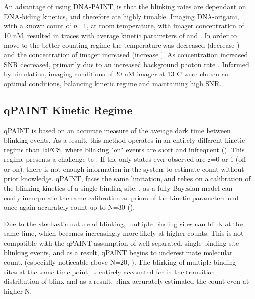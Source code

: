 An advantage of using DNA-PAINT, is that the blinking rates are dependant on DNA-biding kinetics,
	and therefore are highly tunable. %
	Imaging DNA-origami, with a known count of $n$=1, at room temperature, with imager concentration of 10 nM, 
	resulted in traces with average kinetic parameters of  and  . 
	In order to move to the better counting regime the temperature was decreased (decrease \poff) 
	and the concentration of imager increased (increase \pon).
	As concentration increased SNR decreased, primarily due to an increased background photon rate \rb.
	Informed by simulation, imaging conditions of 20 nM imager at 13 C were chosen as optimal conditions,
	balancing kinetic regime and maintaining high SNR.



\subsection{qPAINT Kinetic Regime}
qPAINT is based on an accurate measure of the average dark time between blinking events. 
	As a result, this method operates in an entirely different kinetic regime than lbFCS, where blinking 
	"on" events are short and infrequent ().
	This regime presents a challenge to \ours. If the only states ever observed are z=0 or 1 (off or on),
	there is not enough information in the system to estimate count without prior knowledge.
	qPAINT, faces the same limitation, and relies on a calibration of the blinking kinetics of a single binding site.
	\ours, as a fully Bayesian model can easily incorporate the same calibration as priors of the kinetic parameters
	and once again accurately count up to N=30 ().

Due to the stochastic nature of blinking, multiple binding sites can blink at the same time, 
	which becomes increasingly more likely at higher counts.
	This is not compatible with the qPAINT assumption of well separated, single binding-site blinking events, 
	and as a result, qPAINT begins to underestimate molecular count, (especially noticeable above N=20, ). 
	The blinking of multiple binding sites at the same time point, 
	is entirely accounted for in the transition distribution of blinx 
	and as a result, blinx accurately estimated the count even at higher N.
	

